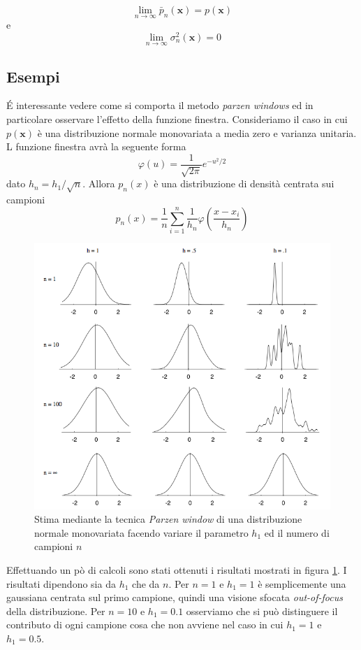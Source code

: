 \begin{equation}
\lim_{n \to \infty} \bar{p}_n(\mathbf{x}) = p(\mathbf{x})
\end{equation}
e
\begin{equation}
\lim_{n \to \infty} \sigma^2_n(\mathbf{x}) = 0
\end{equation}

\subsection{Esempi}
\'E interessante vedere come  si comporta il metodo \emph{parzen windows} ed in particolare osservare l'effetto della funzione finestra. Consideriamo il caso in cui $p(\mathbf{x})$ è una distribuzione normale monovariata a media zero e varianza unitaria. L funzione finestra avrà la seguente forma
\begin{equation}
\varphi(u) = \frac{1}{\sqrt{2\pi}} e^{-u^2/2}
\end{equation}
dato $h_n = h_1/\sqrt{n}$. Allora $p_n(x)$ è una distribuzione di densità centrata sui campioni
\begin{equation}
p_n(x) = \frac{1}{n} \sum_{i=1}^n \frac{1}{h_n} \varphi \left ( \frac{x - x_i}{h_n} \right)
\end{equation}
\begin{figure}
\centering
\includegraphics[scale=0.5]{img/parzen1.png}
\caption{Stima mediante la tecnica \emph{Parzen window} di una distribuzione normale monovariata facendo variare il parametro $h_1$ ed il numero di campioni $n$}
\label{parzen1}
\end{figure}
Effettuando un pò di calcoli sono stati ottenuti i risultati mostrati in figura \ref{parzen1}. I risultati dipendono sia da $h_1$ che da $n$. Per $n=1$ e $h_1=1$ è semplicemente una gaussiana centrata sul primo campione, quindi una visione sfocata \emph{out-of-focus} della distribuzione. Per $n=10$ e $h_1 = 0.1$ osserviamo che si può distinguere il contributo di ogni campione cosa che non avviene nel caso in cui $h_1=1$ e $h_1=0.5$. 

